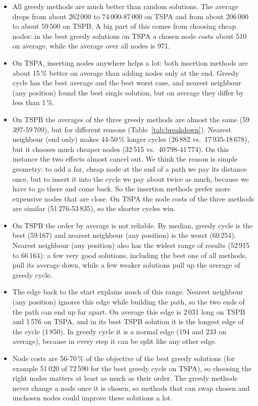 \documentclass[11pt,a4paper]{article}
\begin{document}
\begin{itemize}
  \item All greedy methods are much better than random solutions. The average
        drops from about 262\,000 to 74\,000-87\,000 on TSPA and from about
        206\,000 to about 59\,500 on TSPB. A big part of this comes from
        choosing cheap nodes: in the best greedy solutions on TSPA a chosen
        node costs about 510 on average, while the average over all nodes is
        971.
  \item On TSPA, inserting nodes anywhere helps a lot: both insertion methods
        are about 15\,\% better on average than adding nodes only at the end.
        Greedy cycle has the best average and the best worst case, and nearest
        neighbour (any position) found the best single solution, but on
        average they differ by less than 1\,\%.
  \item On TSPB the averages of the three greedy methods are almost the same
        (59\,397-59\,709), but for different reasons (Table~\ref{tab:breakdown}).
        Nearest neighbour (end only) makes 44-50\,\% longer cycles (26\,882
        vs.\ 17\,935-18\,678), but it chooses much cheaper nodes (32\,515
        vs.\ 40\,798-41\,774). On this instance the two effects almost cancel
        out. We think the reason is simple geometry: to add a far, cheap node
        at the end of a path we pay its distance once, but to insert it into
        the cycle we pay about twice as much, because we have to go there and
        come back. So the insertion methods prefer more expensive nodes that
        are close. On TSPA the node costs of the three methods are similar
        (51\,276-53\,835), so the shorter cycles win.
  \item On TSPB the order by average is not reliable. By median, greedy cycle
        is the best (59\,167) and nearest neighbour (any position) is the worst
        (60\,254). Nearest neighbour (any position) also has the widest range
        of results (52\,915 to 66\,164): a few very good solutions, including
        the best one of all methods, pull its average down, while a few weaker
        solutions pull up the average of greedy cycle.
  \item The edge back to the start explains much of this range. Nearest
        neighbour (any position) ignores this edge while building the path, so
        the two ends of the path can end up far apart. On average this edge is
        2\,031 long on TSPB and 1\,576 on TSPA, and in its best TSPB solution
        it is the longest edge of the cycle (1\,850). In greedy cycle it is a
        normal edge (194 and 233 on average), because in every step it can be
        split like any other edge.
  \item Node costs are 56-70\,\% of the objective of the best greedy solutions
        (for example 51\,020 of 72\,590 for the best greedy cycle on TSPA), so
        choosing the right nodes matters at least as much as their order. The
        greedy methods never change a node once it is chosen, so methods that
        can swap chosen and unchosen nodes could improve these solutions a lot.
\end{itemize}
\end{document}
